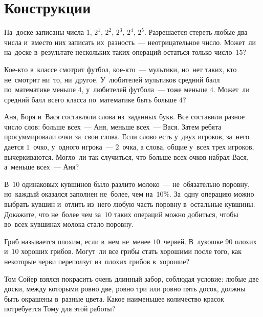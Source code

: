 
\section*{Конструкции}


\begin{problems}

\item
На~доске записаны числа $1$, $2^1$, $2^2$, $2^3$, $2^4$, $2^5$.
Разрешается стереть любые два числа и~вместо них записать их~разность~---
неотрицательное число.
Может~ли на~доске в~результате нескольких таких операций остаться только
число~$15$?

\item
Кое-кто в~классе смотрит футбол, кое-кто~--- мультики, но~нет таких, кто
не~смотрит ни~то, ни~другое.
У~любителей мультиков средний балл по~математике меньше $4$, у~любителей
футбола~--- тоже меньше $4$.
Может~ли средний балл всего класса по~математике быть больше $4$?

\item
Аня, Боря и~Вася составляли слова из~заданных букв.
Все составили разное число слов: больше всех~--- Аня, меньше всех~--- Вася.
Затем ребята просуммировали очки за~свои слова.
Если слово есть у~двух игроков, за~него дается $1$~очко,
у~одного игрока~--- $2$~очка,
а слова, общие у~всех трех игроков, вычеркиваются.
Могло~ли так случиться, что больше всех очков набрал Вася, а~меньше всех~---
Аня?

\item
В~$10$ одинаковых кувшинов было разлито молоко~--- не~обязательно поровну,
но~каждый оказался заполнен не~более, чем на~$10\%$.
За~одну операцию можно выбрать кувшин и~отлить из~него любую часть поровну
в~остальные кувшины.
Докажите, что не~более чем за~$10$ таких операций можно добиться, чтобы во~всех
кувшинах молока стало поровну.

\item
Гриб называется плохим, если в~нем не~менее $10$~червей.
В~лукошке $90$ плохих и~$10$ хороших грибов.
Могут~ли все грибы стать хорошими после того, как некоторые черви переползут
из~плохих грибов в~хорошие?

\item
Том Сойер взялся покрасить очень длинный забор, соблюдая условие: любые две
доски, между которыми ровно две, ровно три или ровно пять досок, должны быть
окрашены в~разные цвета.
Какое наименьшее количество красок потребуется Тому для этой работы?


\end{problems}
